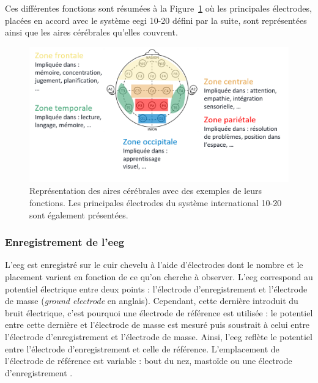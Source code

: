 Ces différentes fonctions sont résumées à la Figure~\ref{Figure:introduction_cortical_areas_and_functions} où les principales électrodes, placées en accord avec le système \gls{eegi} 10-20 
défini par la suite, sont représentées ainsi que les aires cérébrales qu'elles couvrent. 

\begin{figure}[h!]
  \centering
	\includegraphics[width=1\linewidth]{figures/chapter-1/introduction-cortical-areas-and-functions} 
  \caption[Représentation des aires cérébrales avec des exemples de leurs fonctions.]{Représentation des aires cérébrales avec des exemples de leurs fonctions. 
	Les principales électrodes du système international 10-20 sont également présentées.}
  \label{Figure:introduction_cortical_areas_and_functions}
\end{figure}

\subsubsection{Enregistrement de l'\gls{eeg}}

L'\gls{eeg} est enregistré sur le cuir chevelu à l'aide d'électrodes dont le nombre et le placement varient en fonction de ce qu'on cherche à observer. L'\gls{eeg} correspond
au potentiel électrique entre deux points : l'électrode d'enregistrement et l'électrode de masse (\textit{ground electrode} en anglais). Cependant, cette dernière introduit
du bruit électrique, c'est pourquoi une électrode de référence est utilisée : le potentiel entre cette dernière et l'électrode de masse est mesuré puis soustrait à celui entre
l'électrode d'enregistrement et l'électrode de masse. Ainsi, l'\gls{eeg} reflète le potentiel entre l'électrode d'enregistrement et celle
de référence. L'emplacement de l'électrode de référence est variable : bout du nez, mastoïde ou une électrode d'enregistrement \citep{Michel2004}.

